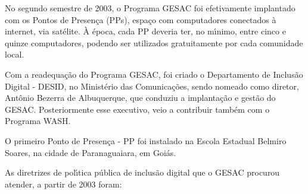 \documentclass[
12pt,		%
openright,	%
twoside,  %
a4paper,			%
chapter=TITLE,		%
english,			%
french,				%
spanish,			%
brazil				%
]{USPSC-classe/USPSC}
\begin{document}
No segundo semestre de 2003, o Programa GESAC foi efetivamente implantado com os Pontos de Presen\c{c}a (PPs), espa\c{c}o com  computadores conectados \`a internet, via sat\'elite. \`A \'epoca, cada PP deveria ter, no m\'{\i}nimo, entre cinco e quinze computadores, podendo ser utilizados gratuitamente por cada comunidade local.









Com a readequa\c{c}\~ao do Programa GESAC, foi criado o Departamento de Inclus\~ao Digital - DESID, no Minist\'erio das Comunica\c{c}\~oes, sendo nomeado como diretor, Ant\^onio Bezerra de Albuquerque, que conduziu a implanta\c{c}\~ao e gest\~ao do GESAC. Posteriormente esse executivo, veio a contribuir tamb\'em com o Programa WASH.










\noindent\begin{center}\mbox{\centering{}}\end{center}


O primeiro Ponto de Presen\c{c}a - PP foi  instalado na  Escola Estadual Belmiro Soares, na cidade de Paranaguaiara, em  Goi\'as.









As diretrizes de pol\'{\i}tica p\'ublica de inclus\~ao digital que o GESAC procurou atender, a partir de 2003 foram:
\end{document}
